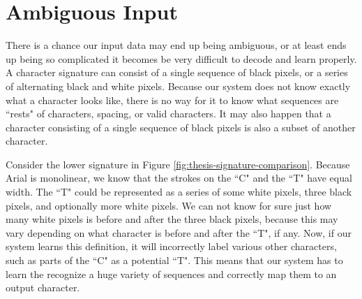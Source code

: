 
\section{Ambiguous Input}
\label{sec:ambiguous_input}
There is a chance our input data may end up being ambiguous, or at least ends up being so complicated it becomes be very difficult to decode and learn properly. A character signature can consist of a single sequence of black pixels, or a series of alternating black and white pixels. Because our system does not know exactly what a character looks like, there is no way for it to know what sequences are ``rests" of characters, spacing, or valid characters. It may also happen that a character consisting of a single sequence of black pixels is also a subset of another character. 

Consider the lower signature in Figure \ref{fig:thesis-signature-comparison}. Because Arial is monolinear, we know that the strokes on the ``C" and the ``T" have equal width. The ``T" could be represented as a series of some white pixels, three black pixels, and optionally more white pixels. We can not know for sure just how many white pixels is before and after the three black pixels, because this may vary depending on what character is before and after the ``T", if any. Now, if our system learns this definition, it will incorrectly label various other characters, such as parts of the ``C" as a potential ``T". This means that our system has to learn the recognize a huge variety of sequences and correctly map them to an output character.

